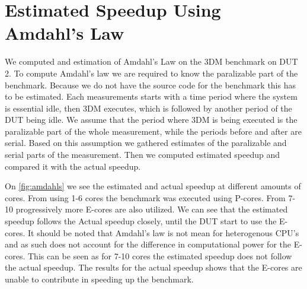 \section{Estimated Speedup Using Amdahl's Law}\label{app:Amdahls}


We computed and estimation of Amdahl's Law on the 3DM benchmark on DUT 2. To compute Amdahl's law we are required to know the paralizable part of the benchmark. Because we do not have the source code for the benchmark this has to be estimated. Each measurements starts with a time period where the system is essential idle, then 3DM executes, which is followed by another period of the DUT being idle. We assume that the period where 3DM is being executed is the paralizable part of the whole measurement, while the periods before and after are serial. Based on this assumption we gathered estimates of the paralizable and serial parts of the measurement. Then we computed estimated speedup and compared it with the actual speedup.

%         
%         
%
%

On \cref{fig:amdahls} we see the estimated and actual speedup at different amounts of cores. From using 1-6 cores the benchmark was executed using P-cores. From 7-10 progressively more E-cores are also utilized. We can see that the estimated speedup follows the Actual speedup closely, until the DUT start to use the E-cores. It should be noted that Amdahl's law is not mean for heterogenous CPU's and as such does not account for the difference in computational power for the E-cores. This can be seen as for 7-10 cores the estimated speedup does not follow the actual speedup. The results for the actual speedup shows that the E-cores are unable to contribute in speeding up the benchmark. 


